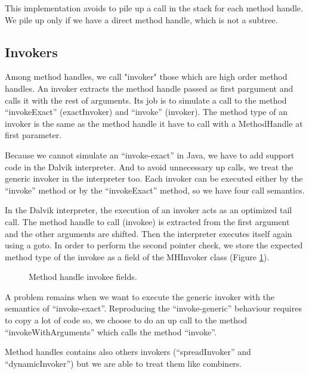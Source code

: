 \documentclass{sig-alternate}
\begin{document}
      This implementation avoids to pile up a call in the stack for each method handle.
      We pile up only if we have a direct method handle, which is not a subtree.

    \subsection{Invokers}

      Among method handles, we call "invoker" those which are high order method handles.
      An invoker extracts the method handle passed as first pargument and calls it with the rest of arguments.
      Its job is to simulate a call to the method ``invokeExact'' (exactInvoker) and ``invoke'' (invoker).
      The method type of an invoker is the same as the method handle it have to call with a MethodHandle at first parameter.

      Because we cannot simulate an ``invoke-exact'' in Java, we have to add support code in the Dalvik interpreter.
      And to avoid unnecessary up calls, we treat the generic invoker in the interpreter too.
      Each invoker can be executed either by the ``invoke'' method or by the ``invokeExact'' method, so we have four call semantics.

      In the Dalvik interpreter, the execution of an invoker acts as an optimized tail call.
      The method handle to call (invokee) is extracted from the first argument and the other arguments are shifted.
      Then the interpreter executes itself again using a goto.
      In order to perform the second pointer check, we store the expected method type of the invokee as a field of the MHInvoker class (Figure \ref{invokeeFields}).

      \begin{figure}[!h]
        \centering \vspace{-1.5em}
        \caption{Method handle invokee fields.}
        \label{invokeeFields}
      \end{figure}

      A problem remains when we want to execute the generic invoker with the semantics of ``invoke-exact''.
      Reproducing the ``invoke-generic'' behaviour requires to copy a lot of code so,
      we choose to do an up call to the method ``invokeWithArguments'' which calls the method ``invoke''.

      Method handles contains also others invokers (``spreadInvoker'' and ``dynamicInvoker'') but we are able to treat them like combiners.
\end{document}
